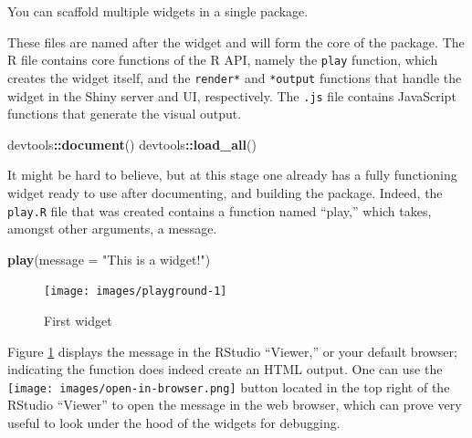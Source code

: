 \documentclass[10pt,]{krantz}
\makeatletter
\newenvironment{Shaded}{\begin{snugshade}}{\end{snugshade}}
\newcommand{\DataTypeTok}[1]{\textcolor[rgb]{0.27,0.27,0.27}{#1}}
\newcommand{\KeywordTok}[1]{\textcolor[rgb]{0.27,0.27,0.27}{\textbf{#1}}}
\newcommand{\NormalTok}[1]{#1}
\newcommand{\OperatorTok}[1]{\textcolor[rgb]{0.43,0.43,0.43}{\textbf{#1}}}
\newcommand{\StringTok}[1]{\textcolor[rgb]{0.5,0.5,0.5}{#1}}
\newenvironment{kframe}{%
\medskip{}
\setlength{\fboxsep}{.8em}
 \def\at@end@of@kframe{}%
 \ifinner\ifhmode%
  \def\at@end@of@kframe{\end{minipage}}%
  \begin{minipage}{\columnwidth}%
 \fi\fi%
 \def\FrameCommand##1{\hskip\@totalleftmargin \hskip-\fboxsep
 \colorbox{shadecolor}{##1}\hskip-\fboxsep
     \hskip-\linewidth \hskip-\@totalleftmargin \hskip\columnwidth}%
 \MakeFramed {\advance\hsize-\width
   \@totalleftmargin\z@ \linewidth\hsize
   \@setminipage}}%
 {\par\unskip\endMakeFramed%
 \at@end@of@kframe}
\renewenvironment{Shaded}{\begin{kframe}}{\end{kframe}}
\newenvironment{rmdblock}[1]
  {
  \begin{itemize}
  \renewcommand{\labelitemi}{
    \raisebox{-.7\height}[0pt][0pt]{
      {\setkeys{Gin}{width=3em,keepaspectratio}\texttt{[image: images/\#1]}}
    }
  }
  \setlength{\fboxsep}{1em}
  \begin{kframe}
  \item
  }
  {
  \end{kframe}
  \end{itemize}
  }
\newenvironment{rmdnote}
  {\begin{rmdblock}{note}}
  {\end{rmdblock}}
\makeatother
\begin{document}
\begin{rmdnote}
You can scaffold multiple widgets in a single package.
\end{rmdnote}

These files are named after the widget and will form the core of the package. The R file contains core functions of the R API, namely the \texttt{play} function, which creates the widget itself, and the \texttt{render*} and \texttt{*output} functions that handle the widget in the Shiny server and UI, respectively. The \texttt{.js} file contains JavaScript functions that generate the visual output.

\begin{Shaded}
\begin{Highlighting}[]
\NormalTok{devtools}\OperatorTok{::}\KeywordTok{document}\NormalTok{()}
\NormalTok{devtools}\OperatorTok{::}\KeywordTok{load_all}\NormalTok{()}
\end{Highlighting}
\end{Shaded}

It might be hard to believe, but at this stage one already has a fully functioning widget ready to use after documenting, and building the package. Indeed, the \texttt{play.R} file that was created contains a function named ``play,'' which takes, amongst other arguments, a message.

\begin{Shaded}
\begin{Highlighting}[]
\KeywordTok{play}\NormalTok{(}\DataTypeTok{message =} \StringTok{"This is a widget!"}\NormalTok{)}
\end{Highlighting}
\end{Shaded}

\begin{figure}[H]

{\centering \texttt{[image: images/playground-1]} 

}

\caption{First widget}\label{fig:playground-1}
\end{figure}

Figure \ref{fig:playground-1} displays the message in the RStudio ``Viewer,'' or your default browser; indicating the function does indeed create an HTML output. One can use the \texttt{[image: images/open-in-browser.png]} button located in the top right of the RStudio ``Viewer'' to open the message in the web browser, which can prove very useful to look under the hood of the widgets for debugging.
\end{document}
